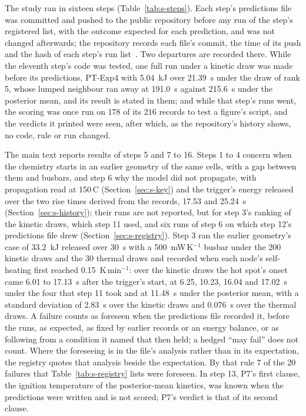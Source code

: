 \documentclass[preprint,12pt]{elsarticle}
\newcommand{\degC}{\,\textdegree C}
\begin{document}
The study ran in sixteen steps (Table~\ref{tab:s-steps}). Each step's predictions file was committed and pushed to the public repository before any run of the step's registered list, with the outcome expected for each prediction, and was not changed afterwards; the repository records each file's commit, the time of its push and the hash of each step's run list~\cite{satte2026repo}. Two departures are recorded there. While the eleventh step's code was tested, one full run under a kinetic draw was made before its predictions, PT-Exp4 with 5.04~kJ over 21.39~s under the draw of rank 5, whose lumped neighbour ran away at 191.0~s against 215.6~s under the posterior mean, and its result is stated in them; and while that step's runs went, the scoring was once run on 178 of its 216 records to test a figure's script, and the verdicts it printed were seen, after which, as the repository's history shows, no code, rule or run changed.


The main text reports results of steps 5 and 7 to 16. Steps 1 to 4 concern when the chemistry starts in an earlier geometry of the same cells, with a gap between them and busbars, and step 6 why the model did not propagate, with propagation read at 150\degC{} (Section~\ref{sec:s-key}) and the trigger's energy released over the two rise times derived from the records, 17.53 and 25.24~s (Section~\ref{sec:s-history}); their runs are not reported, but for step 3's ranking of the kinetic draws, which step 11 used, and six runs of step 6 on which step 12's predictions file drew (Section~\ref{sec:s-registry}). Step 3 ran the earlier geometry's case of 33.2~kJ released over 30~s with a 500~mW\,K$^{-1}$ busbar under the 200 kinetic draws and the 30 thermal draws and recorded when each node's self-heating first reached 0.15~K\,min$^{-1}$: over the kinetic draws the hot spot's onset came 6.01 to 17.13~s after the trigger's start, at 6.25, 10.23, 16.04 and 17.02~s under the four that step 11 took and at 11.48~s under the posterior mean, with a standard deviation of 2.83~s over the kinetic draws and 0.076~s over the thermal draws. A failure counts as foreseen when the predictions file recorded it, before the runs, as expected, as fixed by earlier records or an energy balance, or as following from a condition it named that then held; a hedged ``may fail'' does not count. Where the foreseeing is in the file's analysis rather than in its expectation, the registry quotes that analysis beside the expectation. By that rule 7 of the 20 failures that Table~\ref{tab:s-registry} lists were foreseen. In step 13, P7's first clause, the ignition temperature of the posterior-mean kinetics, was known when the predictions were written and is not scored; P7's verdict is that of its second clause.
\end{document}
